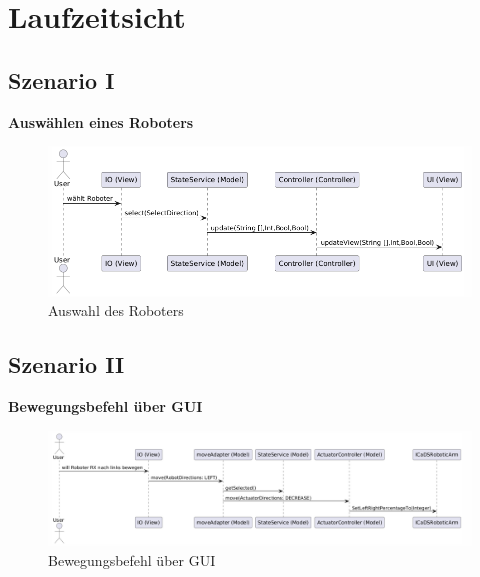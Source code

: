 
\chapter{Laufzeitsicht}

\section{Szenario I}
\textbf{Auswählen eines Roboters}\\

\begin{figure}[h]
    \centering
    \includegraphics[width=0.8\linewidth]{diagrams/selectBefehl250625.png}
    \caption{Auswahl des Roboters}
    \label{fig:Auswahl}
\end{figure}

\clearpage
\section{Szenario II}
\textbf{Bewegungsbefehl über GUI}\\

\begin{figure}[h]  
    \centering
    \includegraphics[width=0.8\linewidth]{diagrams/moveBefehl250625.png}
    \caption{Bewegungsbefehl über GUI}
    \label{fig:Bewegungsbefehl}
\end{figure}





